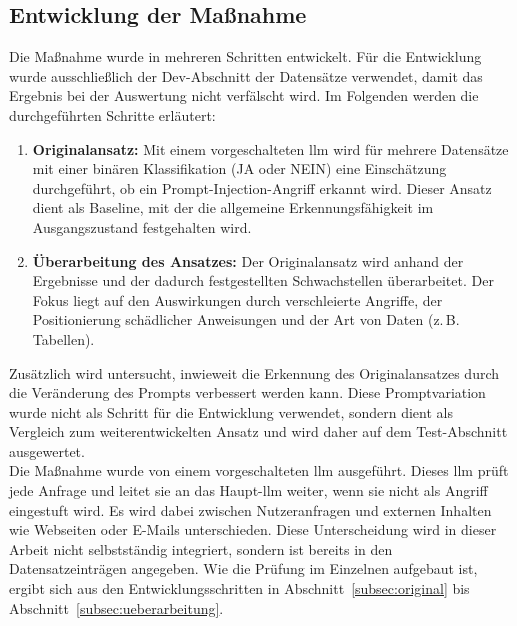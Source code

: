\subsection{Entwicklung der Maßnahme}

Die Maßnahme wurde in mehreren Schritten entwickelt. Für die Entwicklung wurde ausschließlich der Dev-Abschnitt der Datensätze verwendet, damit das Ergebnis bei 
der Auswertung nicht verfälscht wird. Im Folgenden werden die durchgeführten Schritte erläutert:

\begin{enumerate} 
    \item \textbf{Originalansatz:} Mit einem vorgeschalteten \ac{llm} wird für mehrere Datensätze mit einer binären Klassifikation (JA oder NEIN) eine 
    Einschätzung durchgeführt, ob ein Prompt-Injection-Angriff erkannt wird. Dieser Ansatz dient als Baseline, mit der die allgemeine Erkennungsfähigkeit im
    Ausgangszustand festgehalten wird.
    \item \textbf{Überarbeitung des Ansatzes:} Der Originalansatz wird anhand der Ergebnisse und der dadurch festgestellten Schwachstellen überarbeitet. Der 
    Fokus liegt auf den Auswirkungen durch verschleierte Angriffe, der Positionierung schädlicher Anweisungen und der Art von Daten (z.\,B. Tabellen).
\end{enumerate}

Zusätzlich wird untersucht, inwieweit die Erkennung des Originalansatzes durch die Veränderung des Prompts verbessert werden kann. Diese Promptvariation wurde
nicht als Schritt für die Entwicklung verwendet, sondern dient als Vergleich zum weiterentwickelten Ansatz und wird daher auf dem Test-Abschnitt ausgewertet. \\
Die Maßnahme wurde von einem vorgeschalteten \ac{llm} ausgeführt. Dieses \ac{llm} prüft jede Anfrage und leitet sie an das Haupt-\ac{llm} weiter, wenn sie nicht
als Angriff eingestuft wird. Es wird dabei zwischen Nutzeranfragen und externen Inhalten wie Webseiten oder E-Mails unterschieden. 
Diese Unterscheidung wird in dieser Arbeit nicht selbstständig integriert, sondern ist bereits in den Datensatzeinträgen 
angegeben. Wie die Prüfung im Einzelnen aufgebaut ist, ergibt sich aus den Entwicklungsschritten in Abschnitt~\ref{subsec:original} bis 
Abschnitt~\ref{subsec:ueberarbeitung}.


